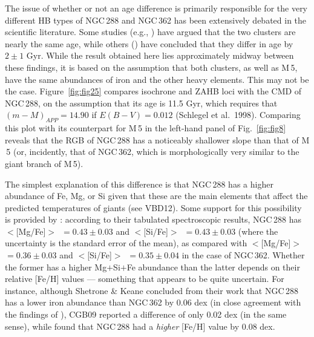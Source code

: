 \documentclass[12pt,preprint]{aastex}
\begin{document}
The issue of whether or not an age difference is primarily responsible for the
very different HB types of NGC$\,$288 and NGC$\,$362 has been extensively
debated in the scientific literature.  Some studies (e.g., \citealt[][also see
\citealt{van00}]{svb96}) have argued that the two clusters are nearly the same
age, while others (\citealt[][\citealt{cat01}]{bff01}) have
concluded that they differ in age by $2 \pm 1$ Gyr.  While the result obtained
here lies approximately midway between these findings, it is based on the
assumption that both clusters, as well as M$\,$5, have the same abundances of
iron and the other heavy elements.  This may not be the case.
Figure~\ref{fig:fig25} compares isochrone and ZAHB loci with the CMD of
NGC$\,$288, on the assumption that its age is 11.5 Gyr, which requires that
$(m-M)_{APP} = 14.90$ if $E(B-V) = 0.012$ (Schlegel et al.~1998).  Comparing
this plot with its counterpart for M$\,$5 in the left-hand panel of
Fig.~\ref{fig:fig8} reveals that the RGB of NGC$\,$288 has a noticeably
shallower slope than that of M$\,$5 (or, incidently, that of NGC$\,$362, which
is morphologically very similar to the giant branch of M$\,$5).

The simplest explanation of this difference is that NGC$\,$288 has a higher
abundance of Fe, Mg, or Si given that these are the main elements that affect 
the predicted temperatures of giants (see VBD12).  Some support for this
possibility is provided by \citet{sk00}: according to their tabulated
spectroscopic results, NGC$\,$288 has $<$[Mg/Fe]$>$\ $= 0.43 \pm 0.03$ and
$<$[Si/Fe]$>$\ $= 0.43 \pm 0.03$ (where the uncertainty is the standard error
of the mean), as compared with $<$[Mg/Fe]$>$\ $= 0.36 \pm 0.03$ and
$<$[Si/Fe]$>$\ $= 0.35 \pm 0.04$ in the case of NGC$\,$362.   Whether the former
has a higher Mg$+$Si$+$Fe abundance than the latter depends on their relative
[Fe/H] values --- something that appears to be quite uncertain.  For instance,
although Shetrone \& Keane concluded from their work that NGC$\,$288 has a lower
iron abundance than NGC$\,$362 by 0.06 dex (in close agreement with the findings
of \citealt{ki03}), CGB09 reported a difference of only 0.02 dex (in the same
sense), while \citet{cg97} found that NGC$\,$288 had a {\it higher} [Fe/H] value
by 0.08 dex.
\end{document}
